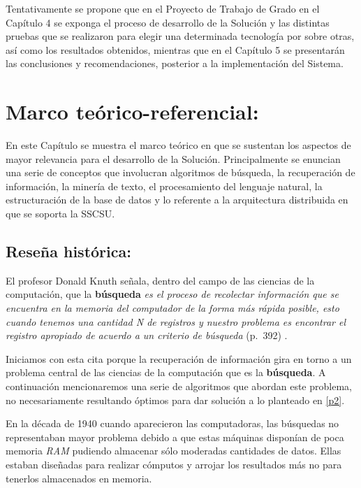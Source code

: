 \documentclass[
  10,
  spanish,
  openany]{book}
\begin{document}
Tentativamente se propone que en el Proyecto de Trabajo de Grado en el Capítulo 4 se exponga el proceso de desarrollo de la Solución y las distintas pruebas que se realizaron para elegir una determinada tecnología por sobre otras, así como los resultados obtenidos, mientras que en el Capítulo 5 se presentarán las conclusiones y recomendaciones, posterior a la implementación del Sistema.

\hypertarget{teorico}{%
\chapter{Marco teórico-referencial:}\label{teorico}}

En este Capítulo se muestra el marco teórico en que se sustentan los aspectos de mayor relevancia para el desarrollo de la Solución. Principalmente se enuncian una serie de conceptos que involucran algoritmos de búsqueda, la recuperación de información, la minería de texto, el procesamiento del lenguaje natural, la estructuración de la base de datos y lo referente a la arquitectura distribuida en que se soporta la SSCSU.

\hypertarget{alghist}{%
\section{Reseña histórica:}\label{alghist}}

El profesor Donald Knuth señala, dentro del campo de las ciencias de la computación, que la \textbf{búsqueda} \emph{es el proceso de recolectar información que se encuentra en la memoria del computador de la forma más rápida posible, esto cuando tenemos una cantidad N de registros y nuestro problema es encontrar el registro apropiado de acuerdo a un criterio de búsqueda} \citep{knuth1997} (p.~392) .

Iniciamos con esta cita porque la recuperación de información gira en torno a un problema central de las ciencias de la computación que es la \textbf{búsqueda}. A continuación mencionaremos una serie de algoritmos que abordan este problema, no necesariamente resultando óptimos para dar solución a lo planteado en \ref{p2}.

En la década de 1940 cuando aparecieron las computadoras, las búsquedas no representaban mayor problema debido a que estas máquinas disponían de poca memoria \emph{RAM} pudiendo almacenar sólo moderadas cantidades de datos. Ellas estaban diseñadas para realizar cómputos y arrojar los resultados más no para tenerlos almacenados en memoria.
\end{document}
